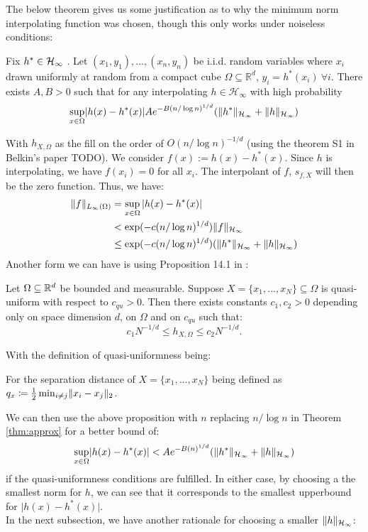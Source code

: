 \documentclass[twoside]{memoir}
\begin{document}
The below theorem gives us some justification as to why the minimum norm interpolating function was chosen, though this only works under noiseless conditions:
\begin{thm} \label{thm:approx}
	Fix $h^* \in \mathcal{H}_\infty $  .
	Let $(x_1,y_1), ..., (x_n,y_n)$ be i.i.d. random variables where $x_i$ drawn uniformly at random from a compact cube $\Omega \subseteq \mathbb{R}^d $,
	$y_i = h^*(x_i) \: \forall i$. There exists $A, B > 0$ such that for any interpolating $h \in \mathcal{H}_\infty $ with high probability
	\begin{equation*}
	\sup_{x \in \Omega} \lvert h(x) - h^*(x)\rvert A e^{-B(n/ \log n)^{1/d}} (\lVert h^*\rVert_{\mathcal{H}_\infty} + \lVert h\rVert_{\mathcal{H}_\infty})
	\end{equation*}
\end{thm}

With $h_{X,\Omega}$ as the fill on the order of $O(n/\log n)^{-1/d}$ (using the theorem S1 in Belkin's paper TODO).
We consider $f(x) := h(x) - h^*(x)$. Since $h$ is interpolating, we have $f(x_i) = 0$ for all $x_i$. The interpolant of $f$, $s_{f,X}$ will then be the zero function. Thus, we have:
\begin{equation*}
\begin{split}
\lVert f\rVert_{L_\infty(\Omega)} &= \sup_{x \in \Omega} \vert h(x) - h^*(x)\vert \\
&< \exp(-c(n/\log n)^{1/d})\lVert f\rVert_{\mathcal{H}_\infty} \\
&\leq \exp(-c(n/\log n)^{1/d}) (\lVert h^*\rVert_{\mathcal{H}_\infty} + \lVert h\rVert_{\mathcal{H}_\infty})
\end{split}
\end{equation*}
Another form we can have is using Proposition 14.1 in \cite{ScatteredDataApproximation}:
\begin{prop}
	Let $\Omega \subseteq \mathbb{R}^d$ be bounded and measurable. Suppose $X = \{x_1, ... , x_N\} \subseteq \Omega$ is quasi-uniform with respect to  $c_{qu} > 0$. Then there exists constants $c_1, c_2 > 0$ depending only on space dimension $d$, on $\Omega$ and on $c_{qu}$ such that:
	\[c_1N^{-1/d} \leq h_{X,\Omega} \leq c_2N^{-1/d}. \]
\end{prop}
With the definition of quasi-uniformness being:
\begin{defn}
	For the separation distance of $X = \{x_1, ... , x_N\}$ being defined as $q_x \coloneqq \frac{1}{2} \min_{i\neq j} \lVert x_i - x_j\rVert_2$.
\end{defn}
We can then use the above proposition with $n$ replacing $n/\log n$ in Theorem \ref{thm:approx} for a better bound of:
\[ \sup_{x \in \Omega} \lvert h(x) - h^*(x)\rvert < A e^{-B(n)^{1/d}} (\lVert h^*\rVert_{\mathcal{H}_\infty} + \lVert h\rVert_{\mathcal{H}_\infty}) \]
if the quasi-uniformness conditions are fulfilled.
In either case, by choosing a the smallest norm for $h$, we can see that it corresponds to the smallest upperbound for $\vert h(x) - h^*(x)\vert$. \\
In the next subsection, we have another rationale for choosing a smaller $\lVert h\rVert_{\mathcal{H}_\infty}$:
\end{document}
